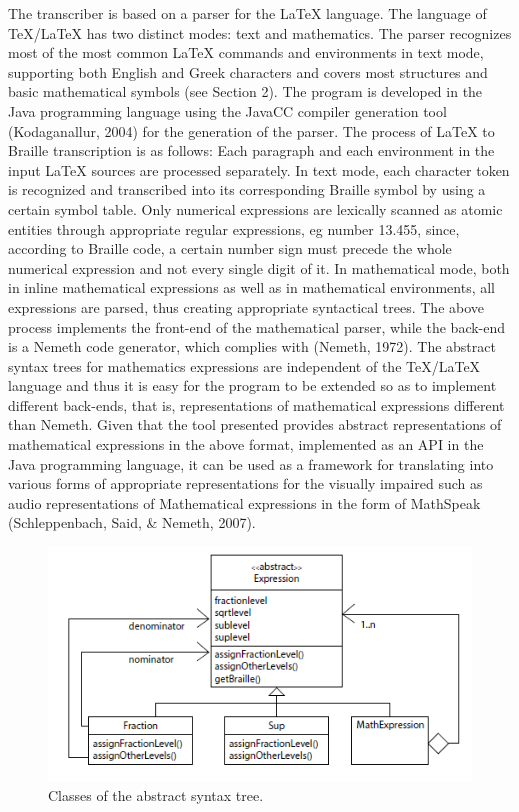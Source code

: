 \documentclass[11.5pt]{sig-alternate} %
\begin{document}
\begin{large}
The transcriber is based on a parser for the LaTeX language. The language of TeX/LaTeX has two distinct modes: text and mathematics. The parser recognizes most of the most common LaTeX commands and environments in text mode, supporting both English and Greek characters and covers most structures and basic mathematical symbols (see Section 2). The program is developed in the Java programming language using the JavaCC compiler generation tool (Kodaganallur, 2004) for the generation of the parser. The process of LaTeX to Braille transcription is as follows: Each paragraph and each environment in the input LaTeX sources are processed separately. In text mode, each character token is recognized and transcribed into its corresponding Braille symbol by using a certain symbol table. Only numerical expressions are lexically scanned as atomic entities through appropriate regular expressions, eg number 13.455, since, according to Braille code, a certain number sign must precede the whole numerical expression and not every single digit of it. In mathematical mode, both in inline mathematical expressions as well as in mathematical environments, all expressions are parsed, thus creating appropriate syntactical trees. The above process implements the front-end of the mathematical parser, while the back-end is a Nemeth code generator, which complies with (Nemeth, 1972). The abstract syntax trees for mathematics expressions are independent of the TeX/LaTeX language and thus it is easy for the program to be extended so as to implement different back-ends, that is, representations of mathematical expressions different than Nemeth. Given that the tool presented provides abstract representations of mathematical expressions in the above format, implemented as an API in the Java programming language, it can be used as a framework for translating into various forms of appropriate representations for the visually impaired such as audio representations of Mathematical expressions in the form of MathSpeak (Schleppenbach, Said, \& Nemeth, 2007).

 
\begin{figure}[h]
    \centering
    \includegraphics[width=1\linewidth]{images/fig 3.png}
    \caption{Classes of the abstract syntax tree.}
\end{figure}


\end{large}
\end{document}
